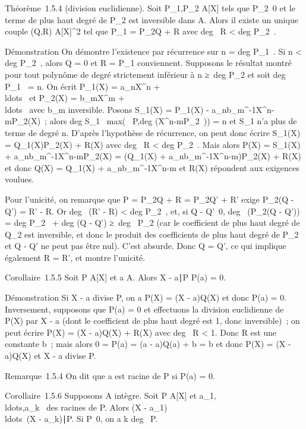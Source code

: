 \documentclass[]{article}
\begin{document}
Théorème~1.5.4 (division euclidienne). Soit P_1,P_2 \in
A{[}X{]} tels que P_2\neq~0 et le terme
de plus haut degré de P_2 est inversible dans A. Alors il
existe un unique couple (Q,R) \in A{[}X{]}^2 tel que
P_1 = P_2Q + R avec deg~ R
\textless{} deg P_2~.

Démonstration On démontre l'existence par récurrence sur n
= deg P_1~. Si n
\textless{} deg P_2~, alors Q = 0 et R
= P_1 conviennent. Supposons le résultat montré pour tout
polynôme de degré strictement inférieur à n ≥\
deg P_2 et soit deg P_1~ =
n. On écrit P_1(X) = a_nX^n +
\\ldots~ et
P_2(X) = b_mX^m +
\\ldots~ avec
b_m inversible. Posons S_1(X) = P_1(X) -
a_nb_m^-1X^n-mP_2(X)~;
alors deg S_1~
\leq max(\deg~
P,deg (X^n-mP_2~)) = n et
S_1 n'a plus de terme de degré n. D'après l'hypothèse de
récurrence, on peut donc écrire S_1(X) =
Q_1(X)P_2(X) + R(X) avec deg~
R \textless{} deg P_2~. Mais alors
P(X) = S_1(X) +
a_nb_m^-1X^n-mP_2(X) =
(Q_1(X) +
a_nb_m^-1X^n-m)P_2(X) +
R(X) et donc Q(X) = Q_1(X) +
a_nb_m^-1X^n-m et R(X) répondent aux
exigences voulues.

Pour l'unicité, on remarque que P = P_2Q + R = P_2Q' +
R' exige P_2(Q - Q') = R' - R. Or deg~
(R' - R) \textless{} deg P_2~, et, si
Q - Q'\neq~0, deg~
(P_2(Q - Q')) = deg P_2~
+ deg (Q - Q') ≥\ deg~
P_2 (car le coefficient de plus haut degré de Q_2 est
inversible, et donc le produit des coefficients de plus haut degré de
P_2 et Q - Q' ne peut pas être nul). C'est absurde. Donc Q =
Q', ce qui implique également R = R', et montre l'unicité.

Corollaire~1.5.5 Soit P \in A{[}X{]} et a \in A. Alors X -
a∣P \mathrel\Leftrightarrow P(a) = 0.

Démonstration Si X - a divise P, on a P(X) = (X - a)Q(X) et donc P(a) =
0. Inversement, supposons que P(a) = 0 et effectuons la division
euclidienne de P(X) par X - a (dont le coefficient de plus haut degré
est 1, donc inversible)~; on peut écrire P(X) = (X - a)Q(X) + R(X) avec
deg~ R \textless{} 1. Donc R est une constante
b~; mais alors 0 = P(a) = (a - a)Q(a) + b = b et donc P(X) = (X - a)Q(X)
et X - a divise P.

Remarque~1.5.4 On dit que a est racine de P si P(a) = 0.

Corollaire~1.5.6 Supposons A intègre. Soit P \in A{[}X{]} et
a_1,\\ldots,a_k~
des racines de P. Alors (X -
a_1)\\ldots~(X
- a_k)∣P. Si
P\neq~0, on a k \leq deg~
P.
\end{document}
